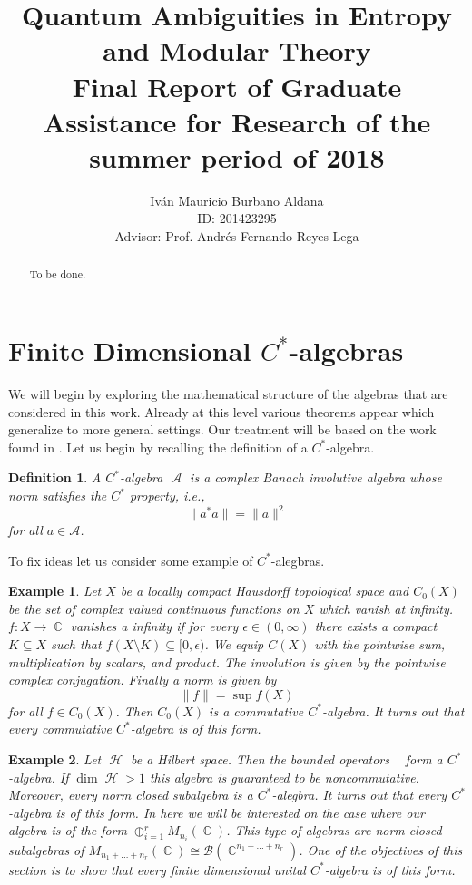 \documentclass{article}
\title{Quantum Ambiguities in Entropy and Modular Theory\\
{\small Final Report of Graduate Assistance for Research of the summer period of 2018}}
\author{Iván Mauricio Burbano Aldana\\
{\small ID: 201423295}\\
{\small Advisor: Prof. Andrés Fernando Reyes Lega}}
\newtheorem{definition}{Definition}
\newtheorem{example}{Example}
\DeclareMathOperator{\A}{\mathcal{A}}
\DeclareMathOperator{\Hil}{\mathcal{H}}
\DeclareMathOperator{\BH}{\mathcal{B}(\Hil)}
\DeclareMathOperator{\C}{\mathbb{C}}
\begin{document}
\maketitle

\begin{abstract}

To be done.

\end{abstract}

\section{Finite Dimensional $C^*$-algebras}

We will begin by exploring the mathematical structure of the algebras that are considered in this work. Already at this level various theorems appear which generalize to more general settings. Our treatment will be based on the work found in \cite{Sundar2012}.
 Let us begin by recalling the definition of a $C^*$-algebra.

\begin{definition}
A $C^*$-algebra $\A$ is a complex Banach involutive algebra whose norm satisfies the $C^*$ property, i.e.,
\begin{equation}
\|a^*a\|=\|a\|^2
\end{equation}
for all $a\in\mathcal{A}$.
\end{definition}

To fix ideas let us consider some example of $C^*$-alegbras.

\begin{example}
Let $X$ be a locally compact Hausdorff topological space and $C_0(X)$ be the set of complex valued continuous functions on $X$ which vanish at infinity. $f:X\rightarrow\C$ vanishes a infinity if for every $\epsilon\in(0,\infty)$ there exists a compact $K\subseteq X$ such that $f(X\setminus K)\subseteq[0,\epsilon)$. We equip $C(X)$ with the pointwise sum, multiplication by scalars, and product. The involution is given by the pointwise complex conjugation. Finally a norm is given by
\begin{equation}
\|f\|=\sup f(X)
\end{equation}
for all $f\in C_0(X)$. Then $C_0(X)$ is a commutative $C^*$-algebra. It turns out that every commutative $C^*$-algebra is of this form.
\end{example}

\begin{example}
Let $\Hil$ be a Hilbert space. Then the bounded operators $\BH$ form a $C^*$-algebra. If $\dim\Hil>1$ this algebra is guaranteed to be noncommutative. Moreover, every norm closed subalgebra is a $C^*$-alegbra. It turns out that every $C^*$-algebra is of this form. In here we will be interested on the case where our algebra is of the form $\oplus_{i=1}^r M_{n_i}(\C)$. This type of algebras are norm closed subalgebras of $M_{n_1+\dots+n_r}(\C)\cong\mathcal{B}(\C^{n_1+\dots+n_r})$. One of the objectives of this section is to show that every finite dimensional unital $C^*$-algebra is of this form. 
\end{example}
\end{document}
